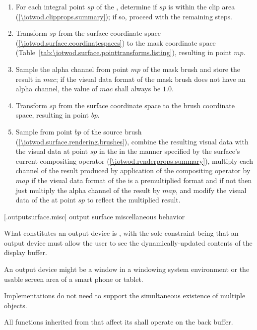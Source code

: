 \begin{enumerate}
\item For each integral point $sp$ of the \underlyingsurface, determine if $sp$ is within the clip area (\ref{\iotwod.clipprops.summary}); if so, proceed with the remaining steps.
\item Transform $sp$ from the surface coordinate space (\ref{\iotwod.surface.coordinatespaces}) to the mask coordinate space (Table~\ref{tab:\iotwod.surface.pointtransforms.listing}), resulting in point $mp$.
\item Sample the alpha channel from point $mp$ of the mask brush and store the result in $mac$; if the visual data format of the mask brush does not have an alpha channel, the value of $mac$ shall always be $1.0$.
\item Transform $sp$ from the surface coordinate space to the brush coordinate space, resulting in point $bp$.
\item Sample from point $bp$ of the source brush (\ref{\iotwod.surface.rendering.brushes}), combine the resulting visual data with the visual data at point $sp$ in the \underlyingsurface in the manner specified by the surface's current compositing operator (\ref{\iotwod.renderprops.summary}), multiply each channel of the result produced by application of the compositing operator by $map$ if the visual data format of the \underlyingsurface is a premultiplied format and if not then just multiply the alpha channel of the result by $map$, and modify the visual data of the \underlyingsurface at point $sp$ to reflect the multiplied result.
\end{enumerate}

 [\iotwod.outputsurface.misc] {output surface miscellaneous behavior}

\pnum
What constitutes an output device is , with the sole constraint being that an output device must allow the user to see the dynamically-updated contents of the display buffer.
\begin{example}
An output device might be a window in a windowing system environment or the usable screen area of a smart phone or tablet.
\end{example}

\pnum
Implementations do not need to support the simultaneous existence of multiple  objects.

\pnum
All functions inherited from  that affect its \underlyingsurface shall operate on the back buffer.

